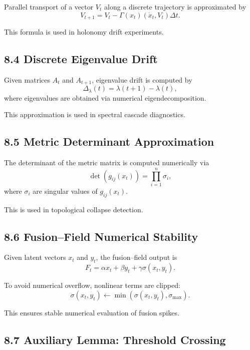 Parallel transport of a vector $V_t$ along a discrete trajectory is
approximated by
\[
V_{t+1}
= V_t - \Gamma(x_t)(\dot{x}_t, V_t)\Delta t.
\]

This formula is used in holonomy drift experiments.

\subsection*{8.4 Discrete Eigenvalue Drift}

Given matrices $A_t$ and $A_{t+1}$, eigenvalue drift is computed by
\[
\Delta_\lambda(t)
= \lambda(t+1) - \lambda(t),
\]
where eigenvalues are obtained via numerical eigendecomposition.

This approximation is used in spectral cascade diagnostics.

\subsection*{8.5 Metric Determinant Approximation}

The determinant of the metric matrix is computed numerically via
\[
\det(g_{ij}(x_t))
= \prod_{i=1}^n \sigma_i,
\]
where $\sigma_i$ are singular values of $g_{ij}(x_t)$.

This is used in topological collapse detection.

\subsection*{8.6 Fusion–Field Numerical Stability}

Given latent vectors $x_t$ and $y_t$, the fusion–field output is
\[
F_t = \alpha x_t + \beta y_t + \gamma \sigma(x_t, y_t).
\]

To avoid numerical overflow, nonlinear terms are clipped:
\[
\sigma(x_t, y_t)
\leftarrow
\min\left( \sigma(x_t, y_t), \sigma_{\max} \right).
\]

This ensures stable numerical evaluation of fusion spikes.

\subsection*{8.7 Auxiliary Lemma: Threshold Crossing}

